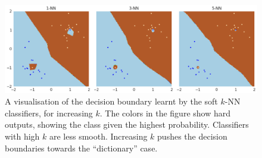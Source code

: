 \documentclass{ociamthesis}
\begin{document}
\begin{figure}[!h]
    \centering
    \includegraphics[scale=0.36]{nn-map.png}
    \caption{A visualisation of the decision boundary learnt by the soft $k$-NN
    classifiers, for increasing $k$. The colors in the figure show hard outputs,
    showing the class given the highest probability. Classifiers with high $k$
    are less smooth. Increasing $k$ pushes the decision boundaries towards the
    ``dictionary'' case.}
    \label{fig:knn-map}
\end{figure}
\end{document}
